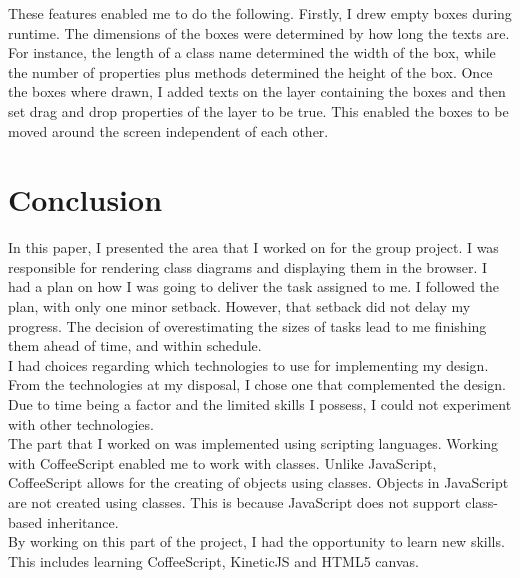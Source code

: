 \documentclass[titlepage,a4paper,11pt]{report}
\begin{document}
\indent These features enabled me to do the following. Firstly, I drew empty boxes during runtime. The dimensions of the boxes were determined by how long the texts are. For instance, the length of a class name determined the width of the box, while the number of properties plus methods determined the height of the box. Once the boxes where drawn, I added texts on the layer containing the boxes and then set drag and drop properties of the layer to be true. This enabled the boxes to be moved around the screen independent of each other.


\section{Conclusion}
In this paper, I presented the area that I worked on for the group project. I was responsible for rendering class diagrams and displaying them in the browser. I had a plan on how I was going to deliver the task assigned to me. I followed the plan, with only one minor setback. However, that setback did not delay my progress. The decision of overestimating the sizes of tasks lead to me finishing them ahead of time, and within schedule. \\

\indent I had choices regarding which technologies to use for implementing my design. From the technologies at my disposal, I chose one that complemented the design. Due to time being a factor and the limited skills I possess, I could not experiment with other technologies.\\

\indent The part that I worked on was implemented using scripting languages. Working with CoffeeScript enabled me to work with classes. Unlike JavaScript, CoffeeScript allows for the creating of objects using classes. Objects in JavaScript are not created using classes. This is because JavaScript does not support class-based inheritance.\\

\indent By working on this part of the project, I had the opportunity to learn new skills. This includes learning CoffeeScript, KineticJS and HTML5 canvas.

\clearpage

\end{document}
